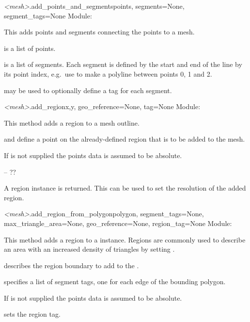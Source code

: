 \documentclass{manual}
\begin{document}
\begin{methoddesc}{\emph{<mesh>}.add_points_and_segments}{points,
                                                          segments=None,
                                                          segment_tags=None}
Module: 

This adds points and segments connecting the points to a mesh.

 is a list of points.

 is a list of segments.  Each segment is defined by the start and end
of the line by its point index, e.g.\ use  to make a
polyline between points 0, 1 and 2.

 may be used to optionally define a tag for each segment.
\end{methoddesc}

\begin{methoddesc}{\emph{<mesh>}.add_region}{x,y, geo_reference=None, tag=None}
Module: 

This method adds a region to a mesh outline.

 and  define a point on the already-defined region that is to
be added to the mesh.

If  is not supplied the points data is assumed to be absolute.

 -- ??

A region instance is returned.  This can be used to set the resolution of the added region.
\end{methoddesc}

\begin{methoddesc}{\emph{<mesh>}.add_region_from_polygon}{polygon,
                                                          segment_tags=None,
                                                          max_triangle_area=None,
                                                          geo_reference=None,
                                                          region_tag=None}
Module: 

This method adds a region to a
 instance.  Regions are commonly used to describe an area
with an increased density of triangles by setting .

 describes the region boundary to add to the .

 specifies a list of segment tags, one for each edge of the
bounding polygon.

If  is not supplied the points data is assumed to be absolute.

 sets the region tag.
\end{methoddesc}
\end{document}
